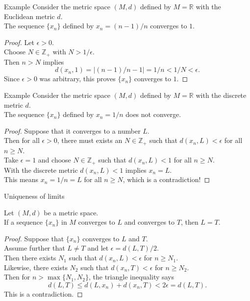 \documentclass{beamer}
\begin{document}
\begin{frame}{Example}
Consider the metric space $(M,d)$ defined by $M=\mathbb{R}$ with the Euclidean metric $d$.\\
\pause
The sequence $\{x_n\}$ defined by $x_n = (n-1)/n$ converges to $1$.\\
\pause
\begin{proof}
\pause
Let $\epsilon > 0$.\\
\pause
Choose $N\in\mathbb{Z}_+$ with $N > 1/\epsilon$.\\
\pause
Then $n>N$ implies
$$d(x_n,1) = |(n-1)/n-1| = 1/n < 1/N < \epsilon.$$
\pause
Since $\epsilon > 0$ was arbitrary, this proves $\{x_n\}$ converges to $1$.
\end{proof}
\end{frame}

\begin{frame}{Example}
Consider the metric space $(M,d)$ defined by $M=\mathbb{R}$ with the {\color{red} discrete} metric $d$.\\
\pause
The sequence $\{x_n\}$ defined by $x_n = 1/n$ does not converge.\\
\pause
\begin{proof}
\pause
Suppose that it converges to a number $L$.\\
\pause
Then for all $\epsilon > 0$, there must exists an $N\in\mathbb{Z}_+$ such that $d(x_n,L) < \epsilon$ for all $n\geq N$.\\
\pause
Take $\epsilon = 1$ and choose $N\in\mathbb{Z}_+$ such that $d(x_n,L) < 1$ for all $n\geq N$.\\
\pause
With the discrete metric $d(x_n,L) < 1$ implies $x_n = L$.\\
\pause
This means $x_n=1/n = L$ for all $n\geq N$, which is a contradiction!
\end{proof}
\end{frame}

\begin{frame}{Uniqueness of limits}
\begin{thm}
\pause
Let $(M,d)$ be a metric space.\\
\pause
If a sequence $\{x_n\}$ in $M$ converges to $L$ and converges to $T$, then $L=T$.
\end{thm}
\pause
\begin{proof}
\pause
Suppose that $\{x_n\}$ converges to $L$ and $T$.\\
\pause
Assume further that $L\neq T$ and let $\epsilon = d(L,T)/2$.\\
\pause
Then there exists $N_1$ such that $d(x_n,L) < \epsilon$ for $n \geq N_1$.\\
\pause
Likewise, there exists $N_2$ such that $d(x_n,T) < \epsilon$ for $n \geq N_2$.\\
\pause
Then for $n>\max\{N_1,N_2\}$,  the triangle inequality says
\pause
$$d(L,T) \leq d(L,x_n) + d(x_n,T) < 2\epsilon = d(L,T).$$
\pause
This is a contradiction.
\end{proof}
\end{frame}
\end{document}
